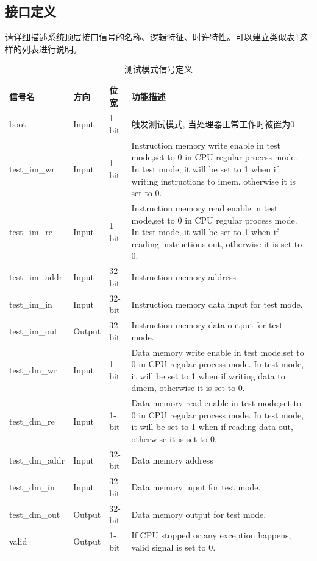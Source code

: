 \documentclass[a4paper]{article}
\begin{document}
\subsection{接口定义}\label{sub:Interface}
请详细描述系统顶层接口信号的名称、逻辑特征、时许特性。可以建立类似表\ref{tab:signaldef}这样的列表进行说明。

\begin{table}[htp]
\caption{测试模式信号定义}\label{tab:signaldef}
\begin{center}
	\begin{tabular}{|l|l|l|p{6cm}|}
	\hline
	\textbf{信号名} & \textbf{方向} & \textbf{位宽} & \textbf{功能描述}\\ \hline \hline
	boot			& Input 	& 1-bit	& 触发测试模式, 当处理器正常工作时被置为0\\ \hline
	test\_im\_wr 	& Input	& 1-bit	& Instruction memory write enable in test mode,set to 0 in 	
								  CPU regular process mode. In test mode, it will be set to 1 when if writing instructions to imem, otherwise it is set to 0.\\ \hline
	test\_im\_re 	& Input & 1-bit & Instruction memory read enable in test mode,set to 0 in 	
								  CPU regular process mode. In test mode, it will be set to 1 when if reading instructions out, otherwise it is set to 0. \\ \hline
	test\_im\_addr 	& Input & 32-bit& Instruction memory address\\ \hline
	test\_im\_in 	& Input & 32-bit& Instruction memory data input for test mode. \\ \hline
	test\_im\_out 	& Output& 32-bit& Instruction memory data output for test mode. \\ \hline
	test\_dm\_wr 	& Input	& 1-bit	& Data memory write enable in test mode,set to 0 in 	
								  CPU regular process mode. In test mode, it will be set to 1 when if writing data to dmem, otherwise it is set to 0.\\ \hline
	test\_dm\_re 	& Input & 1-bit & Data memory read enable in test mode,set to 0 in 	
								  CPU regular process mode. In test mode, it will be set to 1 when if reading data out, otherwise it is set to 0.\\ \hline
	test\_dm\_addr 	& Input & 32-bit& Data memory address\\ \hline
	test\_dm\_in 	& Input & 32-bit& Data memory input for test mode. \\ \hline
	test\_dm\_out 	& Output& 32-bit& Data memory output for test mode. \\ \hline
	valid			& Output& 1-bit & If CPU stopped or any exception happens, valid signal is set to 0.\\ 
	\hline
	\end{tabular}
\end{center}
\end{table}
\end{document}
